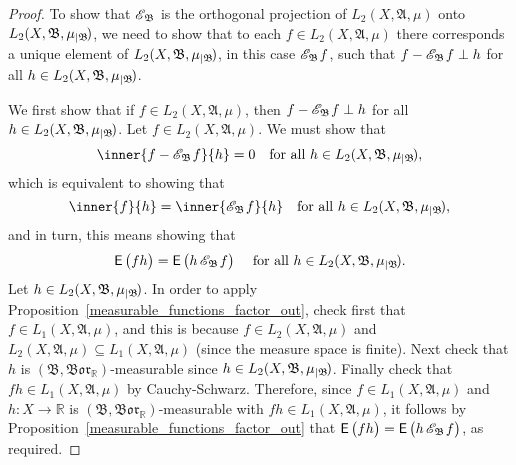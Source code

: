 \documentclass[
twoside=true,
paper=letter,
fontsize=9pt,
pagesize=auto,
leqno,
openany,
headsepline,
overfullrule,
]{scrbook}
\theoremstyle{plain}
\theoremstyle{plain}
\theoremstyle{definition}
\theoremstyle{bfnoteitalic}
\theoremstyle{bfnoteroman}
\newcommand{\sigalg}[1]{\mathfrak{#1}}
\newcommand{\cali}[1]{\mathscr{#1}}
\newcommand{\sfop}[1]{\mathsf{#1}}
\newcommand{\expval}{\sfop{E}\,}
\newcommand{\expvalof}[1]{\expval\bigl(#1\bigr)}
\newcommand{\condexpsub}[2]
{\mathop{\cali{E}\hspace{-1.5pt}}\nolimits_{#2}\hspace{-1pt}#1}
\newcommand{\condexpop}[1]{\mathop{\cali{E}\hspace{-1pt}}\nolimits_{#1}}
\newcommand{\borel}{\mathfrak{Bor}}
\newcommand{\restrictedto}[1]{_{\lvert#1}\kern-1.5pt}
\newcommand{\R}{\mathbb{R}}
\newcommand{\sigmaalgebra}{\sigalg{A}}
\newcommand{\sigmaalgebraii}{\sigalg{B}}
\newcommand{\function}{f}
\newcommand{\functioniii}{h}
\newcommand{\measurespace}{X}
\newcommand{\measure}{\mu}
\begin{document}
\begin{proof}
To show that $\condexpop{\sigmaalgebraii}$ is the orthogonal projection of
$L_2(\measurespace, \sigmaalgebra,\measure)$
onto
$L_2(\measurespace, \sigmaalgebraii,\measure\restrictedto{\sigmaalgebraii})$, we need to show that to each $\function\in L_2(\measurespace, \sigmaalgebra,\measure)$ there corresponds a unique element of 
$L_2(\measurespace, \sigmaalgebraii,\measure\restrictedto{\sigmaalgebraii})$, in this case 
$\condexpsub{\function}{\sigmaalgebraii}$, 
such that 
$\function - \condexpsub{\function}{\sigmaalgebraii} \perp \functioniii$ for all $\functioniii\in
L_2(\measurespace, \sigmaalgebraii,\measure\restrictedto{\sigmaalgebraii})$.


We first show that if 
$\function\in L_2(\measurespace, \sigmaalgebra,\measure)$, 
then
$\function - \condexpsub{\function}{\sigmaalgebraii} \perp \functioniii$ for all $\functioniii\in
L_2(\measurespace, \sigmaalgebraii,\measure\restrictedto{\sigmaalgebraii})$.
Let 
$\function \in L_2(\measurespace, \sigmaalgebra,\measure)$.
We must show that  
\[
\inner{\function - \condexpsub{\function}{\sigmaalgebraii}}{\functioniii}=0
\quad
\text{for all 
$\functioniii\in L_2(\measurespace, \sigmaalgebraii,\measure\restrictedto{\sigmaalgebraii})$},
\] 
which is equivalent to showing that 
\[
\inner{\function}{\functioniii} = \inner{\condexpsub{\function}{\sigmaalgebraii}}{\functioniii}
\quad
\text{for all 
$\functioniii\in L_2(\measurespace, \sigmaalgebraii,\measure\restrictedto{\sigmaalgebraii})$},
\] 
and in turn, this means showing that
\[
\expvalof{\function\functioniii} = \expvalof{\functioniii \condexpsub{\function}{\sigmaalgebraii}}
\quad
\text{
for all 
$\functioniii\in L_2(\measurespace, \sigmaalgebraii,\measure\restrictedto{\sigmaalgebraii})$}.
\]  
Let $\functioniii\in L_2(\measurespace, \sigmaalgebraii,\measure\restrictedto{\sigmaalgebraii})$.
In order to apply Proposition~\ref{measurable_functions_factor_out}, 
check first that
$\function \in L_1(\measurespace, \sigmaalgebra,\measure)$, and this is because
$\function \in L_2(\measurespace, \sigmaalgebra,\measure)$ and 
$L_2(\measurespace, \sigmaalgebra,\measure) \subseteq
L_1(\measurespace, \sigmaalgebra,\measure)$ (since the measure space is finite).
Next check that
$\functioniii$ is
$(\sigmaalgebraii, \borel_\R)$\hyp{}measurable
since
$\functioniii\in L_2(\measurespace, \sigmaalgebraii,\measure\restrictedto{\sigmaalgebraii})$.
Finally check that $\function\functioniii\in L_1(\measurespace, \sigmaalgebra,\measure)$ by Cauchy-Schwarz.
Therefore, 
since 
$\function \in L_1(\measurespace, \sigmaalgebra,\measure)$ and
$\functioniii:\measurespace\to\R$ is $(\sigmaalgebraii, \borel_\R)$\hyp{}measurable with 
$\function\functioniii\in L_1(\measurespace, \sigmaalgebra,\measure)$, 
it follows by Proposition~\ref{measurable_functions_factor_out} that 
$\expvalof{\function\functioniii} = \expvalof{\functioniii \condexpsub{\function}{\sigmaalgebraii}}$, as required.


\end{proof}
\end{document}
